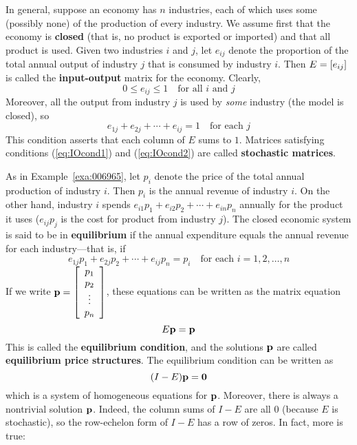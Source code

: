 In general, suppose an economy has $n$ industries, each of which uses some (possibly none) of the production of every industry. We assume first that the economy is \textbf{closed} (that is, no product is exported or imported) and that all product is used. Given two industries $i$ and $j$, let $e_{ij}$ denote the proportion of the total annual output of industry $j$ that is consumed by industry $i$. Then $E = \left[ e_{ij} \right]$ is called the \textbf{input-output} matrix for the economy. Clearly,
\begin{equation}\label{eq:IOcond1}
0 \leq e_{ij} \leq 1 \quad \mbox{for all } i \mbox{ and } j
\end{equation}
Moreover, all the output from industry $j$ is used by \textit{some} industry (the model is closed), so
\begin{equation}\label{eq:IOcond2}
e_{1j} + e_{2j} + \cdots + e_{ij} = 1 \quad \mbox{for each } j
\end{equation}
This condition asserts that each column of $E$ sums to $1$. Matrices satisfying conditions (\ref{eq:IOcond1}) and (\ref{eq:IOcond2}) are called \textbf{stochastic matrices}.

As in Example~\ref{exa:006965}, let $p_{i}$ denote the price of the total annual production of industry $i$. Then $p_{i}$ is the annual revenue of industry $i$. On the other hand, industry $i$ spends $e_{i1}p_{1} + e_{i2}p_{2} + \cdots + e_{in}p_{n}$ annually for the product it uses ($e_{ij}p_{j}$ is the cost for product from industry $j$). The closed economic system is said to be in \textbf{equilibrium} if the annual expenditure equals the annual revenue for each industry---that is, if
\begin{equation*}
e_{1j}p_{1} + e_{2j}p_{2} + \cdots + e_{ij}p_{n} = p_{i} \quad \mbox{for each } i = 1, 2, \dots, n
\end{equation*}
If we write $\textbf{p} = \left[ \begin{array}{c}
p_{1} \\
p_{2} \\
\vdots \\
p_{n}
\end{array} \right]$,
 these equations can be written as the matrix equation
\begin{equation*}
E\textbf{p} = \textbf{p}
\end{equation*}
This is called the \textbf{equilibrium condition}, and the solutions $\textbf{p}$ are called \textbf{equilibrium price structures}. The equilibrium condition can be written as
\begin{equation*}
(I - E)\textbf{p} = \textbf{0}
\end{equation*}
which is a system of homogeneous equations for $\textbf{p}$. Moreover, there is always a nontrivial solution $\textbf{p}$. Indeed, the column sums of $I - E$ are all $0$ (because $E$ is stochastic), so the row-echelon form of $I - E$ has a row of zeros. In fact, more is true:

